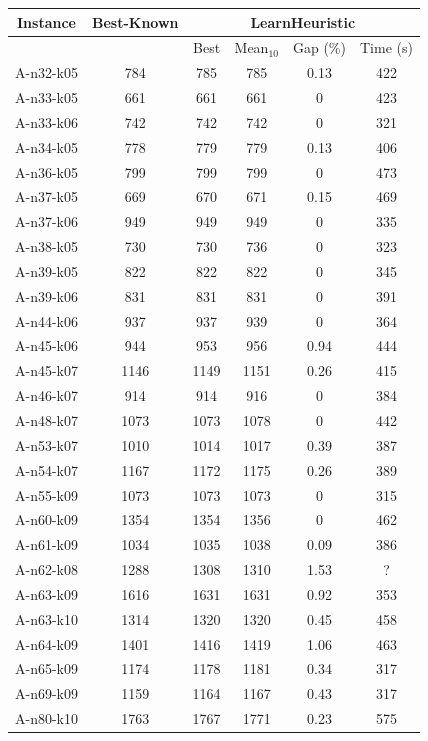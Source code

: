 \documentclass[a4paper,11pt]{article}%
\begin{document}
\begin{table}[h!]
\begin{center}
\begin{tabular}{|@{}c@{}|@{}c@{}|@{}c@{}|@{}c@{}|@{}c@{}|@{}c@{}|}
\hline
 Instance & Best-Known & \multicolumn{4}{c|}{LearnHeuristic}  \\
 \hline
 & & Best & Mean$_{10}$ & Gap (\%) & Time (s) \\ 
 \hline
 A-n32-k05 & 784 & 785 & 785 & 0.13 & 422  \\
 \hline
 A-n33-k05   & 661 & 661 & 661 &0 & 423   \\
  \hline
   A-n33-k06 & 742 & 742 & 742 &0 & 321  \\
 \hline
   A-n34-k05 & 778 & 779 & 779 &0.13 & 406  \\
  \hline
   A-n36-k05 & 799 & 799 & 799 & 0 & 473  \\
 \hline
  A-n37-k05  & 669 & 670 & 671 & 0.15 & 469  \\
  \hline
  A-n37-k06 & 949 & 949 & 949 & 0 & 335 \\
 \hline
  A-n38-k05  & 730 & 730 & 736 & 0 & 323 \\
 \hline
 A-n39-k05 & 822 & 822 & 822 & 0 & 345 \\
 \hline
  A-n39-k06  & 831 & 831 & 831 & 0 & 391   \\
 \hline
   A-n44-k06 & 937 & 937 & 939 & 0 & 364   \\
  \hline
   A-n45-k06 & 944 & 953 & 956 & 0.94 & 444  \\
 \hline 
  A-n45-k07  & 1146 & 1149 & 1151 & 0.26 & 415 \\
  \hline
  A-n46-k07  & 914 & 914 & 916 &0 & 384  \\
  \hline
  A-n48-k07 & 1073 & 1073 & 1078 &0 & 442  \\
 \hline
  A-n53-k07  & 1010 & 1014 & 1017 &0.39 & 387   \\
  \hline
  A-n54-k07  & 1167 & 1172 & 1175 & 0.26 & 389   \\
  \hline
  A-n55-k09 & 1073 & 1073 & 1073 &0 & 315  \\
 \hline 
   A-n60-k09 & 1354 & 1354 & 1356 &0 & 462   \\
  \hline 
  A-n61-k09  & 1034 & 1035 & 1038 &0.09 & 386  \\
  \hline
    A-n62-k08  & 1288 & 1308 & 1310 &1.53 & ?   \\
  \hline
    A-n63-k09  & 1616 & 1631 & 1631 &0.92 & 353   \\
  \hline
    A-n63-k10  & 1314 & 1320 &1320 &0.45 & 458   \\
  \hline
    A-n64-k09  & 1401 & 1416 & 1419 &1.06 & 463   \\
  \hline
    A-n65-k09  & 1174 & 1178 & 1181 &0.34 & 317   \\
  \hline
    A-n69-k09  & 1159 & 1164 & 1167 & 0.43 & 317   \\
  \hline
    A-n80-k10  & 1763 & 1767 & 1771 & 0.23 & 575   \\
  \hline
\end{tabular}
\end{center}
\end{table}
\end{document}
